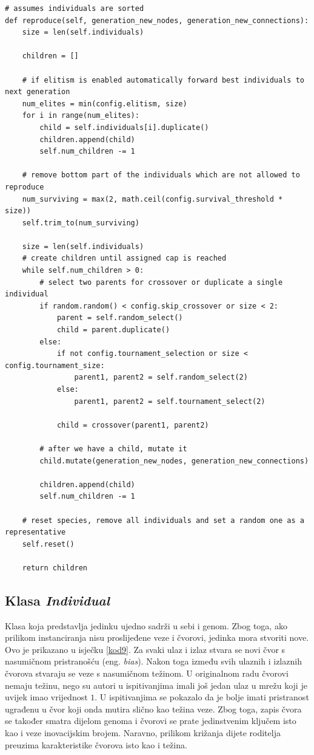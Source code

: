\documentclass[times, utf8, diplomski, numeric]{fer}
\begin{document}
\begin{lstlisting}[frame=single, label=kod8, caption=Izvorni tekst metode \textit{reproduce} u klasi \textit{Species}]
# assumes individuals are sorted
def reproduce(self, generation_new_nodes, generation_new_connections):
	size = len(self.individuals)

	children = []

	# if elitism is enabled automatically forward best individuals to next generation
	num_elites = min(config.elitism, size)
	for i in range(num_elites):
		child = self.individuals[i].duplicate()
		children.append(child)
		self.num_children -= 1

	# remove bottom part of the individuals which are not allowed to reproduce
	num_surviving = max(2, math.ceil(config.survival_threshold * size))
	self.trim_to(num_surviving)

	size = len(self.individuals)
	# create children until assigned cap is reached
	while self.num_children > 0:
		# select two parents for crossover or duplicate a single individual
		if random.random() < config.skip_crossover or size < 2:
			parent = self.random_select()
			child = parent.duplicate()
		else:
			if not config.tournament_selection or size < config.tournament_size:
				parent1, parent2 = self.random_select(2)
			else:
				parent1, parent2 = self.tournament_select(2)

			child = crossover(parent1, parent2)

		# after we have a child, mutate it
		child.mutate(generation_new_nodes, generation_new_connections)

		children.append(child)
		self.num_children -= 1

	# reset species, remove all individuals and set a random one as a representative
	self.reset()

	return children
\end{lstlisting}

\subsection{Klasa \textit{Individual}}
Klasa koja predstavlja jedinku ujedno sadrži u sebi i genom. Zbog toga, ako prilikom instanciranja nisu proslijeđene veze i čvorovi, jedinka mora stvoriti nove. Ovo je prikazano u isječku \ref{kod9}. Za svaki ulaz i izlaz stvara se novi čvor s nasumičnom pristranošću (eng. \textit{bias}). Nakon toga između svih ulaznih i izlaznih čvorova stvaraju se veze s nasumičnom težinom. U originalnom radu \citep{rad5} čvorovi nemaju težinu, nego su autori u ispitivanjima imali još jedan ulaz u mrežu koji je uvijek imao vrijednost $1$. U ispitivanjima se pokazalo da je bolje imati pristranost ugrađenu u čvor koji onda mutira slično kao težina veze. Zbog toga, zapis čvora se također smatra dijelom genoma i čvorovi se prate jedinstvenim ključem isto kao i veze inovacijskim brojem. Naravno, prilikom križanja dijete roditelja preuzima karakteristike čvorova isto kao i težina.
\end{document}

